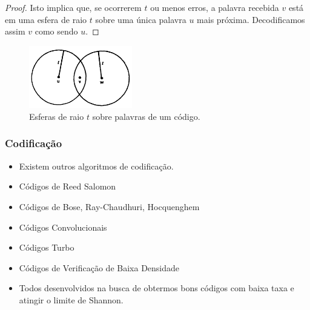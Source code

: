 \begin{frame}[allowframebreaks]
\begin{proof}
	 Isto implica que, se ocorrerem $t$ ou menos erros, a palavra recebida $v$ está em uma esfera
	 de raio $t$ sobre uma única palavra $u$ mais próxima. Decodificamos assim $v$ como sendo $u$.
     \end{proof}

     \begin{figure}[h!]
     \centering
     \includegraphics[width=0.4\textwidth]{images/StSt.png}
     \caption{Esferas de raio $t$ sobre palavras de um código.}
     \label{fig:StSt}
     \end{figure}

\end{frame}

\begin{frame}[allowframebreaks]
  \frametitle{Codificação}
  \begin{itemize}
  \item Existem outros algoritmos de codificação.
  \item Códigos de Reed Salomon
  \item Códigos de Bose, Ray-Chaudhuri, Hocquenghem
  \item Códigos Convolucionais
  \item Códigos Turbo
  \item Códigos de Verificação de Baixa Densidade
  \item Todos desenvolvidos na busca de obtermos bons códigos com baixa taxa e atingir o limite de Shannon.
  \end{itemize}
\end{frame}




